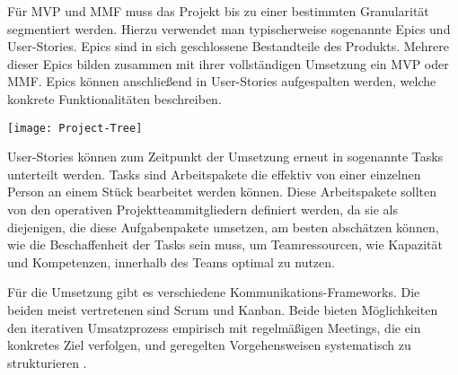 Für MVP und MMF muss das Projekt bis zu einer bestimmten Granularität segmentiert werden. Hierzu verwendet man typischerweise sogenannte Epics und User-Stories. Epics sind in sich geschlossene Bestandteile des Produkts. Mehrere dieser Epics bilden zusammen mit ihrer vollständigen Umsetzung ein MVP oder MMF. Epics können anschließend in User-Stories aufgespalten werden, welche konkrete Funktionalitäten beschreiben. \cite{agilesProjektmanagementImBerufsalltagEpicsUndUserStories}

\vspace{20pt}
\begin{center}
    \begin{minipage}{0.8\linewidth}
        \texttt{[image: Project-Tree]}
    \end{minipage}
\end{center}
\vspace{20pt}

User-Stories können zum Zeitpunkt der Umsetzung erneut in sogenannte Tasks unterteilt werden. Tasks sind Arbeitspakete die effektiv von einer einzelnen Person an einem Stück bearbeitet werden können. Diese Arbeitspakete sollten von den operativen Projektteammitgliedern definiert werden, da sie als diejenigen, die diese Aufgabenpakete umsetzen, am besten abschätzen können, wie die Beschaffenheit der Tasks sein muss, um Teamressourcen, wie Kapazität und Kompetenzen, innerhalb des Teams optimal zu nutzen. \cite{agilesProjektmanagementImBerufsalltagEpicsUndUserStories}

Für die Umsetzung gibt es verschiedene Kommunikations-Frameworks. Die beiden meist vertretenen sind Scrum und Kanban. Beide bieten Möglichkeiten den iterativen Umsatzprozess empirisch mit regelmäßigen Meetings, die ein konkretes Ziel verfolgen, und geregelten Vorgehensweisen systematisch zu strukturieren \cite{agilesProjektmanagementImBerufsalltagEpicsUndUserStories}.

